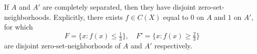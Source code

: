 If $A$ and $A'$ are completely separated, then they have disjoint zero-set-neighborhoods. Explicitly, there exists $f \in C(X)$ equal to $0$ on $A$ and $1$ on $A'$, for which
$$F = \{x: f(x) \leq \tfrac{1}{3}\}, \quad F' = \{x: f(x) \geq \tfrac{2}{3}\}$$
are disjoint zero-set-neighborhoods of $A$ and $A'$ respectively.
